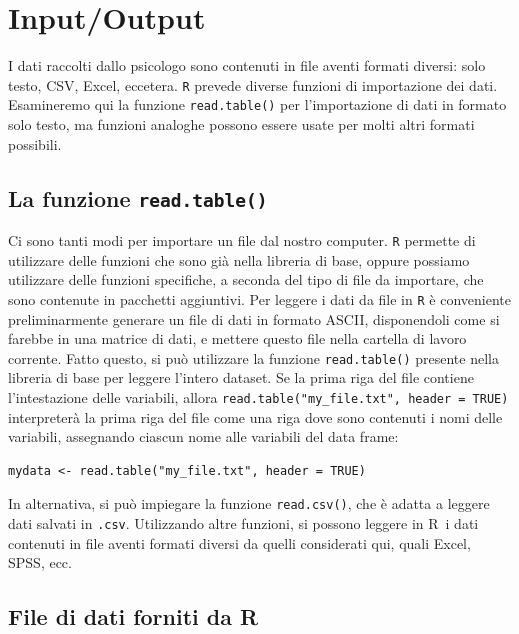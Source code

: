 \documentclass[
]{memoir}
\theoremstyle{definition}
\theoremstyle{definition}
\theoremstyle{definition}
\theoremstyle{definition}
\theoremstyle{remark}
\begin{document}
\hypertarget{chapter-input-output}{%
\section{Input/Output}\label{chapter-input-output}}

I dati raccolti dallo psicologo sono contenuti in file aventi formati
diversi: solo testo, CSV, Excel, eccetera. \texttt{R} prevede diverse funzioni
di importazione dei dati. Esamineremo qui la funzione \texttt{read.table()} per
l'importazione di dati in formato solo testo, ma funzioni analoghe
possono essere usate per molti altri formati possibili.

\hypertarget{la-funzione-read.table}{%
\subsection{\texorpdfstring{La funzione \texttt{read.table()}}{La funzione read.table()}}\label{la-funzione-read.table}}

Ci sono tanti modi per importare un file dal nostro computer. \texttt{R} permette di utilizzare delle funzioni che sono già nella libreria di base, oppure possiamo utilizzare delle funzioni specifiche, a seconda del tipo di file da importare, che sono contenute in pacchetti aggiuntivi. Per leggere i dati da file in \texttt{R} è conveniente
preliminarmente generare un file di dati in formato ASCII, disponendoli
come si farebbe in una matrice di dati, e mettere questo file nella
cartella di lavoro corrente. Fatto questo, si può utilizzare la funzione
\texttt{read.table()} presente nella libreria di base per leggere l'intero
dataset. Se la prima riga del file contiene l'intestazione delle
variabili, allora \texttt{read.table("my\_file.txt",\ header\ =\ TRUE)}
interpreterà la prima riga del file come una riga dove sono contenuti i
nomi delle variabili, assegnando ciascun nome alle variabili del data
frame:

\begin{verbatim}
mydata <- read.table("my_file.txt", header = TRUE)
\end{verbatim}

In alternativa, si può impiegare la funzione \texttt{read.csv()}, che è adatta
a leggere dati salvati in \texttt{.csv}. Utilizzando altre funzioni, si possono
leggere in R  i dati contenuti in file aventi formati diversi da quelli
considerati qui, quali Excel, SPSS, ecc.

\hypertarget{file-di-dati-forniti-da-r}{%
\subsection{File di dati forniti da R}\label{file-di-dati-forniti-da-r}}
\end{document}
